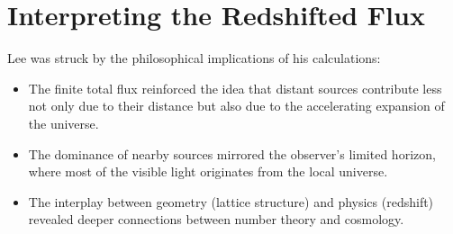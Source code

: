 % 
% 
% 
% 
% 
% 
% 
% 
% 
\section*{Interpreting the Redshifted Flux}
Lee was struck by the philosophical implications of his calculations:
\begin{itemize}
    \item The finite total flux reinforced the idea that distant sources contribute less not only due to their distance but also due to the accelerating expansion of the universe.
    \item The dominance of nearby sources mirrored the observer’s limited horizon, where most of the visible light originates from the local universe.
    \item The interplay between geometry (lattice structure) and physics (redshift) revealed deeper connections between number theory and cosmology.
\end{itemize}

